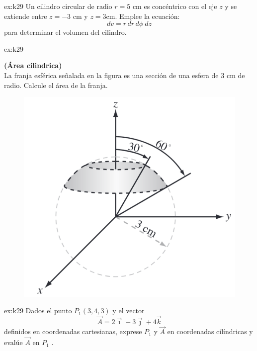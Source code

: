 \begin{multicols}{2}
     \begin{excercise}[][][$V=471.2\, \rm{cm^3}$]{ex:k29}{ 
             Un cilindro circular de radio $r=5$ cm  es concéntrico con el eje $z$ y se extiende entre $z=-3$ cm y $z=3$cm. Emplee la ecuación:
             \begin{equation*}
                 dv=r\,dr\,d\phi\ dz
             \end{equation*}
             para determinar el volumen del cilindro. 
          }
     \end{excercise}

     \begin{excercise}[][][$S=20.7\, \rm{cm^2}$]{ex:k29}{ \textbf{(Área cilindrica)}\\
             La franja esférica señalada en la figura es una sección de una esfera de $3$ cm de radio. Calcule el área de la franja.           
             \begin{figure}[H]
                 \centering
                 \includegraphics[width=0.8\linewidth]{img/01_electric-field/3.png}
             \end{figure}
          }
     \end{excercise}

     \begin{excercise}[][][$P_1=P_1(5, 306.9^\circ, 3)$; $\vec{A}=3.6\vec{e}_r-0.2\vec{e}_\phi+4\vec{k}$]{ex:k29}{ 
             Dados el punto $P_1 (3, 4, 3)$ y el vector
             \begin{equation*}
                 \vec{A}=2\vec{\imath}-3\vec{\jmath} +4\vec{k}
             \end{equation*}
             definidos en coordenadas cartesianas, exprese $P_1$ y $\vec{A}$ en coordenadas cilíndricas y evalúe $\vec{A}$ en $P_1$ .
          }
     \end{excercise}


\end{multicols}
